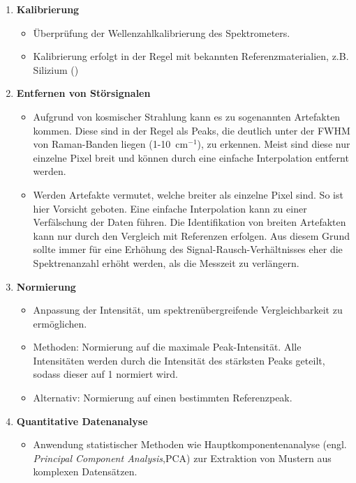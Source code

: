\begin{enumerate}
    \item \textbf{Kalibrierung}
    \begin{itemize}
        \item Überprüfung der Wellenzahlkalibrierung des Spektrometers.
        \item Kalibrierung erfolgt in der Regel mit bekannten Referenzmaterialien, z.B. Silizium ()
    \end{itemize}
    \item \textbf{Entfernen von Störsignalen}
        \begin{itemize}
        \item Aufgrund von kosmischer Strahlung kann es zu sogenannten Artefakten kommen. Diese sind in der Regel als 
        Peaks, die deutlich unter der FWHM von Raman-Banden liegen (1-10~cm$^{-1}$), zu erkennen. Meist sind diese nur
         einzelne Pixel breit und können durch eine einfache Interpolation entfernt werden.
        \item Werden Artefakte vermutet, welche breiter als einzelne Pixel sind. So ist hier Vorsicht geboten. Eine einfache Interpolation
        kann zu einer Verfälschung der Daten führen. Die Identifikation von breiten Artefakten kann nur durch den Vergleich 
        mit Referenzen erfolgen. Aus diesem Grund sollte immer für eine Erhöhung des Signal-Rausch-Verhältnisses eher die Spektrenanzahl 
        erhöht werden, als die Messzeit zu verlängern.
    \end{itemize}
    \item \textbf{Normierung}
    \begin{itemize}
        \item Anpassung der Intensität, um spektrenübergreifende Vergleichbarkeit zu ermöglichen.
        \item Methoden: Normierung auf die maximale Peak-Intensität. Alle Intensitäten werden durch die Intensität des stärksten Peaks geteilt, sodass dieser auf 1 normiert wird.
        \item Alternativ: Normierung auf einen bestimmten Referenzpeak.
    \end{itemize}
    \item \textbf{Quantitative Datenanalyse}
    \begin{itemize}
        \item Anwendung statistischer Methoden wie Hauptkomponentenanalyse (engl. \textit{Principal Component Analysis},PCA) zur Extraktion von Mustern aus komplexen Datensätzen.

\end{itemize}
\end{enumerate}
